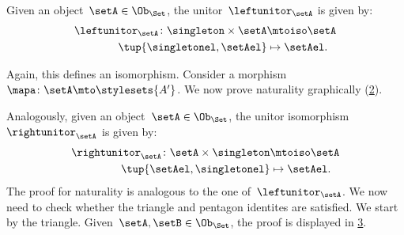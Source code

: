 \begin{example}
    \begin{figure}[h!]
        \begin{center}
        \end{center}
        \caption{\label{fig:monoidal_set_ass_nat}}
    \end{figure}

    Given an object~$\setA\in \Ob_\Set$, the unitor~$\leftunitor_\setA$ is given by:
    \begin{equation*}
        \label{eq:set_mon_prod_4}
        \begin{aligned}
            \leftunitor_\setA\colon \singleton \times \setA &\mtoiso \setA\\
            \tup{\singletonel,\setAel}&\mapsto \setAel.
        \end{aligned}
    \end{equation*}

    Again, this defines an isomorphism.
    Consider a morphism~$\mapa\colon \setA\mto \stylesets{A'}$.
    We now prove naturality graphically (\cref{fig:monoidal_set_unit_nat}).

    \begin{figure}[h!]
        \begin{center}
        \end{center}
        \caption{\label{fig:monoidal_set_unit_nat}}
    \end{figure}

    Analogously, given an object~$\setA\in \Ob_{\Set}$, the unitor isomorphism~$\rightunitor_\setA$ is given by:
    \begin{equation*}
        \label{eq:set_mon_prod_5}
        \begin{aligned}
            \rightunitor_\setA\colon \setA\times \singleton &\mtoiso \setA\\
            \tup{\setAel,\singletonel}&\mapsto \setAel.
        \end{aligned}
    \end{equation*}
    The proof for naturality is analogous to the one of~$\leftunitor_\setA$.
    We now need to check whether the triangle and pentagon identites are satisfied.
    We start by the triangle. Given~$\setA,\setB\in \Ob_{\Set}$, the proof is displayed in \cref{fig:set_mon_triangle}.

    \begin{figure}[h]
        \begin{center}
        \end{center}
        \caption{\label{fig:set_mon_triangle}}
    \end{figure}


\end{example}
